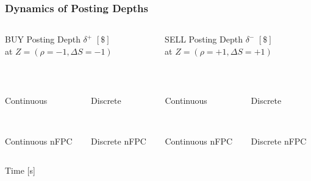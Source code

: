 \begin{frame}
\frametitle{Dynamics of Posting Depths}
\begin{columns}[T] %
\begin{column}{.48\textwidth}
BUY Posting Depth $\delta^+$ $[\$]$\\
at $Z=(\rho = -1, \Delta S = -1)$
\end{column}%
\hfill%
\begin{column}{.48\textwidth}
SELL Posting Depth $\delta^-$ $[\$]$\\
at $Z=(\rho = +1, \Delta S = +1)$
\end{column}%
\end{columns}
\vspace{\baselineskip}
\begin{columns}[T] %
\begin{column}{.24\textwidth}
\centering%
\\
{\scriptsize Continuous \par}
\\
{\scriptsize Continuous nFPC \par}
\end{column}%
\begin{column}{.24\textwidth}
\centering%
\\
{\scriptsize Discrete \par}
\\
{\scriptsize Discrete nFPC \par}
\end{column}%
\hfill%
\vrule{}
\hfill%
\begin{column}{.24\textwidth}
\centering%
\\
{\scriptsize Continuous \par}
\\
{\scriptsize Continuous nFPC \par}
\end{column}%
\begin{column}{.24\textwidth}
\centering%
\\
{\scriptsize Discrete \par}
\\
{\scriptsize Discrete nFPC \par}
\end{column}%
\end{columns}
\centering
{\vspace{0.5\baselineskip} \scriptsize Time [s] \par}
\vspace{0.5\baselineskip}
\end{frame}

